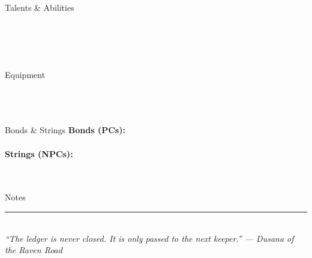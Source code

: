 \documentclass[10pt]{article}
\begin{document}
\hfill
\begin{minipage}[t]{0.48\linewidth}
    \begin{charbox}{Talents \& Abilities}
        \vspace{0.2cm}
        \underline{\hspace{8cm}}\\
        \underline{\hspace{8cm}}\\
        \underline{\hspace{8cm}}\\
        \underline{\hspace{8cm}}\\
        \underline{\hspace{8cm}}\\
    \end{charbox}
    
    \vspace{0.5em}
    
    \begin{charbox}{Equipment}
        \underline{\hspace{8cm}}\\
        \underline{\hspace{8cm}}\\
        \underline{\hspace{8cm}}\\
        \underline{\hspace{8cm}}\\
    \end{charbox}
    
    \vspace{0.5em}
    
    \begin{charbox}{Bonds \& Strings}
        \textbf{Bonds (PCs):}\\
        \underline{\hspace{8cm}}\\
        \textbf{Strings (NPCs):}\\
        \underline{\hspace{8cm}}\\
        \underline{\hspace{8cm}}\\
    \end{charbox}
    
    \vspace{0.5em}
    
    \begin{charbox}{Notes}
        \vspace{1.5cm}
    \end{charbox}
\end{minipage}

\vspace{1em}

\begin{center}
    \rule{0.8\textwidth}{0.3pt}\\[0.3em]
    {\small\sffamily\itshape ``The ledger is never closed. It is only passed to the next keeper.'' --- Dusana of the Raven Road}
\end{center}

\end{document}
